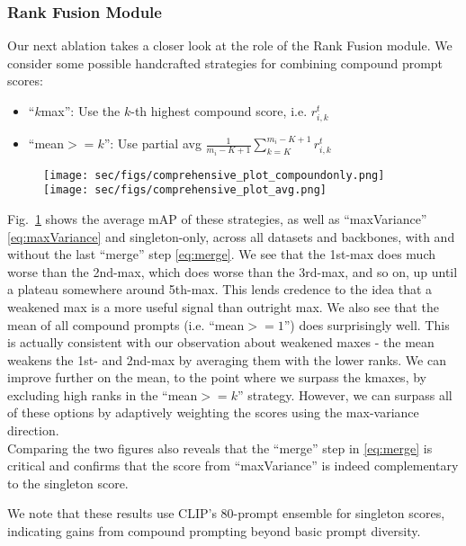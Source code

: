 \subsubsection{Rank Fusion Module}
\label{subsubsec:RankFusionAblation}
Our next ablation takes a closer look at the role of the Rank Fusion module. We consider some possible handcrafted strategies for combining compound prompt scores:
\begin{itemize}
    \item ``$k$max'': Use the $k$-th highest compound score, i.e. $r_{i,k}^t$
    \item ``mean$>=k$'': Use partial avg $\frac{1}{m_i-K+1} \sum_{k=K}^{m_i-K+1} r_{i,k}^t$
\end{itemize}
\begin{figure}[h]
  \centering
   \texttt{[image: sec/figs/comprehensive\_plot\_compoundonly.png]}
   \texttt{[image: sec/figs/comprehensive\_plot\_avg.png]}
   \caption{\captionRankFusionAblation}
   \label{fig:RankFusionAblation}
\end{figure}
Fig.~\ref{fig:RankFusionAblation} shows the average mAP of these strategies, as well as ``maxVariance'' \eqref{eq:maxVariance} and singleton-only, across all datasets and backbones, with and without the last ``merge'' step \eqref{eq:merge}. We see that the 1st-max does much worse than the 2nd-max, which does worse than the 3rd-max, and so on, up until a plateau somewhere around 5th-max. This lends credence to the idea that a weakened max is a more useful \mbox{signal} than outright max. We also see that the mean of all compound prompts (i.e. ``mean$>=\!1$'') does surprisingly well. This is actually consistent with our observation about weakened maxes - the mean weakens the 1st- and 2nd-max by averaging them with the lower ranks. We can improve further on the mean, to the point where we surpass the kmaxes, by excluding high ranks in the ``mean$>=k$'' strategy. However, we can surpass all of these options by adaptively weighting the scores using the max-variance direction.\\
Comparing the two figures also reveals that the ``merge'' step in \eqref{eq:merge} is critical and confirms that the score from ``maxVariance'' is indeed complementary to the singleton score.

We note that these results use CLIP's 80-prompt ensemble for singleton scores, indicating gains from compound prompting beyond basic prompt diversity.

